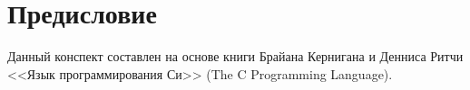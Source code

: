 \chapter*{Предисловие}

Данный конспект составлен на основе книги Брайана Кернигана и Денниса Ритчи
<<Язык программирования Си>> (The C Programming Language).

